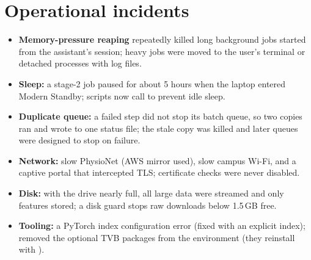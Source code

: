 \section{Operational incidents}

\begin{itemize}
\item \textbf{Memory-pressure reaping} repeatedly killed long background jobs started from the assistant's session; heavy jobs were moved to the user's terminal or detached processes with log files.
\item \textbf{Sleep:} a stage-2 job paused for about 5 hours when the laptop entered Modern Standby; scripts now call  to prevent idle sleep.
\item \textbf{Duplicate queue:} a failed step did not stop its batch queue, so two copies ran and wrote to one status file; the stale copy was killed and later queues were designed to stop on failure.
\item \textbf{Network:} slow PhysioNet (AWS mirror used), slow campus Wi-Fi, and a captive portal that intercepted TLS; certificate checks were never disabled.
\item \textbf{Disk:} with the drive nearly full, all large data were streamed and only features stored; a disk guard stops raw downloads below 1.5\,GB free.
\item \textbf{Tooling:} a PyTorch index configuration error (fixed with an explicit index);  removed the optional TVB packages from the environment (they reinstall with ).
\end{itemize}
